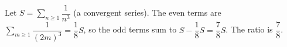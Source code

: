 Let $S=\sum_{n\ge1}\dfrac{1}{n^3}$ (a convergent series). The even terms are $\sum_{m\ge1}\dfrac{1}{(2m)^3}=\dfrac{1}{8}S$, so the odd terms sum to $S-\dfrac{1}{8}S=\dfrac{7}{8}S$. The ratio is $\boxed{\dfrac{7}{8}}$.
